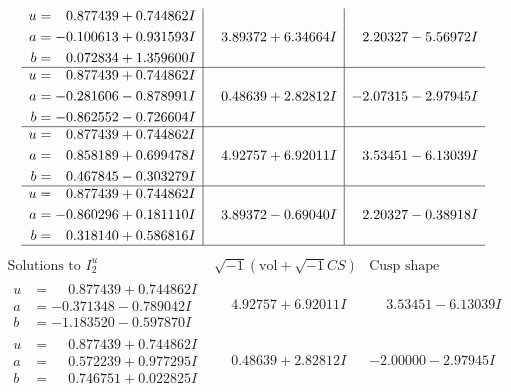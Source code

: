 \documentclass[1p]{elsarticle_modified}
\theoremstyle{definition}
\newcommand{\I}{\sqrt{-1}}
\begin{document}
$$\begin{array}{c|c|c}
\begin{aligned}
u &= \phantom{-}0.877439 + 0.744862 I \\
a &= -0.100613 + 0.931593 I \\
b &= \phantom{-}0.072834 + 1.359600 I\end{aligned}
 & \phantom{-}3.89372 + 6.34664 I & \phantom{-}2.20327 - 5.56972 I \\ \hline\begin{aligned}
u &= \phantom{-}0.877439 + 0.744862 I \\
a &= -0.281606 - 0.878991 I \\
b &= -0.862552 - 0.726604 I\end{aligned}
 & \phantom{-}0.48639 + 2.82812 I & -2.07315 - 2.97945 I \\ \hline\begin{aligned}
u &= \phantom{-}0.877439 + 0.744862 I \\
a &= \phantom{-}0.858189 + 0.699478 I \\
b &= \phantom{-}0.467845 - 0.303279 I\end{aligned}
 & \phantom{-}4.92757 + 6.92011 I & \phantom{-}3.53451 - 6.13039 I \\ \hline\begin{aligned}
u &= \phantom{-}0.877439 + 0.744862 I \\
a &= -0.860296 + 0.181110 I \\
b &= \phantom{-}0.318140 + 0.586816 I\end{aligned}
 & \phantom{-}3.89372 - 0.69040 I & \phantom{-}2.20327 - 0.38918 I\\
 \hline 
 \end{array}$$\newpage$$\begin{array}{c|c|c}  
\text{Solutions to }I^u_{2}& \I (\text{vol} + \sqrt{-1}CS) & \text{Cusp shape}\\
 \hline 
\begin{aligned}
u &= \phantom{-}0.877439 + 0.744862 I \\
a &= -0.371348 - 0.789042 I \\
b &= -1.183520 - 0.597870 I\end{aligned}
 & \phantom{-}4.92757 + 6.92011 I & \phantom{-}3.53451 - 6.13039 I \\ \hline\begin{aligned}
u &= \phantom{-}0.877439 + 0.744862 I \\
a &= \phantom{-}0.572239 + 0.977295 I \\
b &= \phantom{-}0.746751 + 0.022825 I\end{aligned}
 & \phantom{-}0.48639 + 2.82812 I & -2.00000 - 2.97945 I \\ \hline\begin{aligned}

\end{aligned}
\end{array}$$
\end{document}
